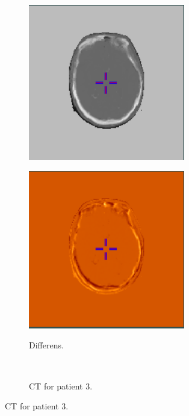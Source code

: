 \begin{figure}
\begin{subfigure}[b]{0.3\textwidth}
        \includegraphics[width=0.75\textwidth]{colager/loocv_ct/loocv_010769_sct.png}
        \label{col:loocv_ct_pat2_sct}
    \end{subfigure}\hfill
    \begin{subfigure}[b]{0.3\textwidth}
        \caption{Differens.}
        \includegraphics[width=0.75\textwidth]{colager/loocv_ct/loocv_010769_sub.png}
        \label{col:loocv_ct_pat2_sub}
    \end{subfigure}\\
    \begin{subfigure}[b]{0.3\textwidth}
        \caption{CT for patient 3.}

\end{subfigure}
\end{figure}
